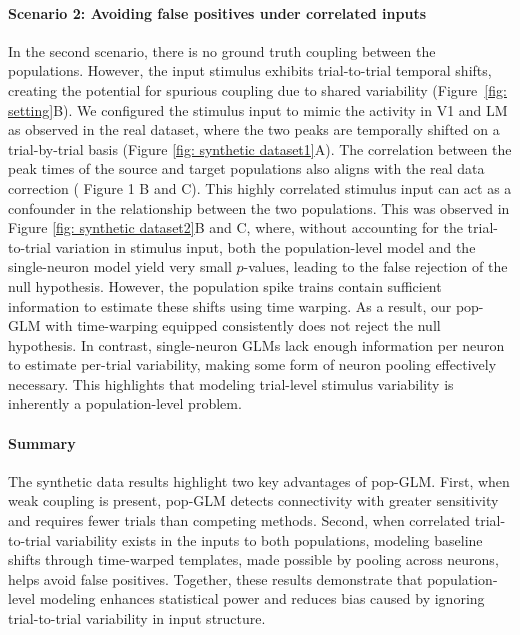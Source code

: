 \documentclass[12pt]{article}
\begin{document}
\paragraph{Scenario 2: Avoiding false positives under correlated inputs}
In the second scenario, there is no ground truth coupling between the populations. However, the input stimulus exhibits trial-to-trial temporal shifts, creating the potential for spurious coupling due to shared variability (Figure~\ref{fig: setting}B). We configured the stimulus input to mimic the activity in V1 and LM as observed in the real dataset, where the two peaks are temporally shifted on a trial-by-trial basis (Figure \ref{fig: synthetic dataset1}A). The correlation between the peak times of the source and target populations also aligns with the real data correction (\citep{chen2022population} Figure 1 B and C). This highly correlated stimulus input can act as a confounder in the relationship between the two populations. This was observed in Figure \ref{fig: synthetic dataset2}B and C, where, without accounting for the trial-to-trial variation in stimulus input, both the population-level model and the single-neuron model yield very small $p$-values, leading to the false rejection of the null hypothesis. However, the population spike trains contain sufficient information to estimate these shifts using time warping. As a result, our pop-GLM with time-warping equipped consistently does not reject the null hypothesis. In contrast, single-neuron GLMs lack enough information per neuron to estimate per-trial variability, making some form of neuron pooling effectively necessary. This highlights that modeling trial-level stimulus variability is inherently a population-level problem.

\paragraph{Summary}
The synthetic data results highlight two key advantages of pop-GLM. First, when weak coupling is present, pop-GLM detects connectivity with greater sensitivity and requires fewer trials than competing methods. Second, when correlated trial-to-trial variability exists in the inputs to both populations, modeling baseline shifts through time-warped templates, made possible by pooling across neurons, helps avoid false positives. Together, these results demonstrate that population-level modeling enhances statistical power and reduces bias caused by ignoring trial-to-trial variability in input structure.
\end{document}
